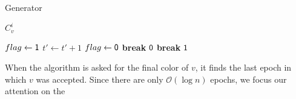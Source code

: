 \begin{algorithm}[H]
\caption{Generator}
\begin{algorithmic}[1]

            \State \Return $C^i_v$
        \EndIf
    \EndFor
\EndProcedure

                    \State $flag\gets \mathsf{1}$
                        \State $t'\gets t' + 1$
                            \State $flag\gets \mathsf{0}$
                            \State \textbf{break}
                        \EndIf
                    \EndWhile
                        \State \Return $\mathsf{0}$
                    \EndIf
                    \State \textbf{break}
               \EndIf
           \EndIf
        \EndFor
    \EndFor
    \State \Return $\mathsf{1}$
\EndProcedure

\end{algorithmic}
\label{alg:coloring}
\end{algorithm}

When the algorithm is asked for the final color of $v$, it finds the last epoch in which $v$ was accepted.
Since there are only $\mathcal O(\log n)$ epochs, we focus our attention on the 

